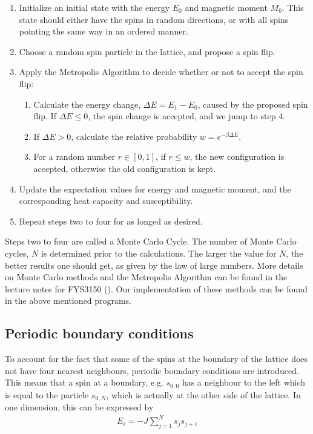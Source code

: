 \documentclass[12pt,english,a4paper]{article}
\begin{document}
\begin{enumerate}
    \item Initialize an initial state with the energy $E_0$ and magnetic moment $M_0$. This state should either have the spins in random directions, or with all spins pointing the same way in an ordered manner.
    \item Choose a random spin particle in the lattice, and propose a spin flip. 
    \item Apply the Metropolis Algorithm to decide whether or not to accept the spin flip:
        \begin{enumerate}
            \item Calculate the energy change, $\Delta E=E_1-E_0$, caused by the proposed spin flip. If $\Delta E \le 0$, the spin change is accepted, and we jump to step 4.
            \item If $\Delta E > 0$, calculate the relative probability $w=e^{-\beta \Delta E}$.
            \item For a random number $r \in [0,1]$, if $r \le w$, the new configuration is accepted, otherwise the old configuration is kept.
        \end{enumerate}
    \item Update the expectation values for energy and magnetic moment, and the corresponding heat capacity and susceptibility.
    \item Repeat steps two to four for as longed as desired.
\end{enumerate}

\noindent Steps two to four are called a Monte Carlo Cycle. The number of Monte Carlo cycles, $N$ is determined prior to the calculations. The larger the value for $N$, the better results one should get, as given by the law of large numbers. More details on Monte Carlo methods and the Metropolis Algorithm can be found in the lecture notes for FYS3150 (\cite{LectureIsing}). Our implementation of these methods can be found in the above mentioned programs. 


\subsection{Periodic boundary conditions}
To account for the fact that some of the spins at the boundary of the lattice does not have four nearest neighbours, periodic boundary conditions are introduced. This means that a spin at a boundary, e.g. $s_{0,0}$ has a neighbour to the left which is equal to the particle $s_{0,N}$, which is actually at the other side of the lattice. In one dimension, this can be expressed by
\begin{align*}
    E_i=-J\sum_{j=1}^{N}s_js_{j+1}
\end{align*}
\end{document}
